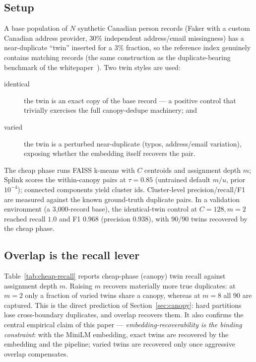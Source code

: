 \documentclass[11pt]{article}
\begin{document}
\subsection{Setup}
A base population of $N$ synthetic Canadian person records (Faker with a custom Canadian
address provider, 30\% independent address/email missingness) has a near-duplicate ``twin''
inserted for a $3\%$ fraction, so the reference index genuinely contains matching records
(the same construction as the duplicate-bearing benchmark of the whitepaper~\cite{pipeline}).
Two twin styles are used:

\begin{description}
  \item[identical] the twin is an exact copy of the base record --- a positive control that
        trivially exercises the full canopy-dedupe machinery; and
  \item[varied] the twin is a perturbed near-duplicate (typos, address/email variation),
        exposing whether the embedding itself recovers the pair.
\end{description}

The cheap phase runs FAISS k-means with $C$ centroids and assignment depth $m$; Splink scores
the within-canopy pairs at $\tau=0.85$ (untrained default $m/u$, prior
$10^{-4}$); connected components yield cluster ids. Cluster-level precision/recall/F1 are
measured against the known ground-truth duplicate pairs. In a validation environment
(a 3{,}000-record base), the identical-twin control at $C=128, m=2$ reached recall $1.0$ and
F1 $0.968$ (precision $0.938$), with 90/90 twins recovered by the cheap phase.

\subsection{Overlap is the recall lever}
Table~\ref{tab:cheap-recall} reports cheap-phase (canopy) twin recall against assignment
depth $m$. Raising $m$ recovers materially more true duplicates: at $m=2$ only a fraction of
varied twins share a canopy, whereas at $m=8$ all 90 are captured. This is the direct
prediction of Section~\ref{sec:canopy}: hard partitions lose cross-boundary duplicates, and
overlap recovers them. It also confirms the central empirical claim of this paper ---
\emph{embedding-recoverability is the binding constraint}: with the MiniLM embedding, exact
twins are recovered by the embedding and the pipeline; varied twins are recovered only once
aggressive overlap compensates.
\end{document}
